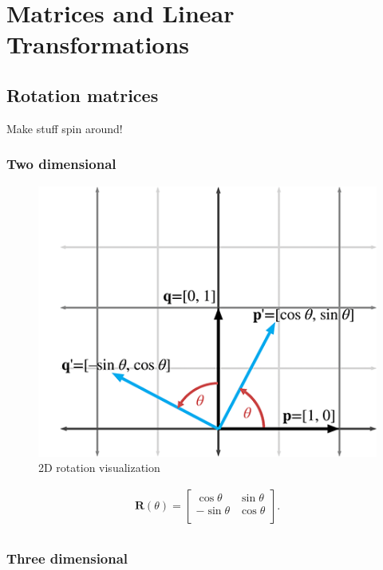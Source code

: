 \documentclass[a4paper,11pt]{article}
\begin{document}
\newpage	
\section{Matrices and Linear Transformations}

\subsection{Rotation matrices}

Make stuff spin around!

\subsubsection{Two dimensional}

\begin{figure}[H]
\centering
    \includegraphics{05_2d_rotation}
\caption{2D rotation visualization}
\label{fig:2d-rotation-visualization}
\end{figure}

$$
\begin{matrix}
{\mathbf{R}(\theta) =
\begin{bmatrix}
{\cos\theta} & {\sin\theta} \\
{- \sin\theta} & {\cos\theta} \\
\end{bmatrix}.} \\
\end{matrix}
$$

\subsubsection{Three dimensional}
\end{document}
